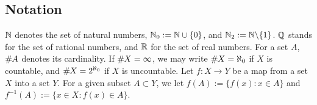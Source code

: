 
\subsection{Notation}

$\mathbb{N}$ denotes the set of natural numbers, $\mathbb{N}_0 := \mathbb{N} \cup \{0\}$, and $\mathbb{N}_2 := \mathbb{N} \backslash \{1\}$. $\mathbb{Q}$ stands for the set of rational numbers, and $\mathbb{R}$ for the set of real numbers. For a set $A$, $\# \hspace{-0.2mm} A $ denotes its cardinality. If $\# \hspace{-0.2mm} X  = \infty$, we may write $\# \hspace{-0.2mm} X  = \aleph_0$ if $X$ is countable, and $\# \hspace{-0.2mm} X  = 2^{\aleph_0}$ if $X$ is uncountable. 
Let $f : X \to Y$ be a map from a set $X$ into a set $Y$. For a given subset $A \subset Y$, we let $f(A) := \{ f(x) : x \in A\}$ and $f^{-1}(A) := \{ x \in X : f(x) \in A\}$.

